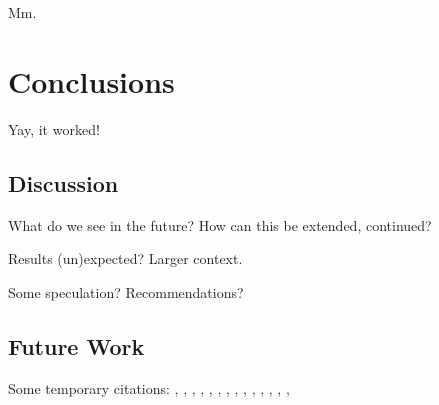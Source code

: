 \documentclass[a4paper,11pt]{kth-mag}
\begin{document}
Mm.





\pagestyle{newchap}
\chapter{Conclusions}
Yay, it worked!


\section{Discussion}

What do we see in the future? How can this be extended, continued?

Results (un)expected? Larger context.

Some speculation? Recommendations?

\section{Future Work}


Some temporary citations:
\cite{hoare69}, \cite{floyd67}, \cite{pnueli77}, \cite{leucker09abriefaccount},
\cite{bauer06monitoring}, \cite{bauer08goodbadugly}, \cite{delgado04taxonomy},
\cite{meyer92applyingdbc}, \cite{rosenblum95practicalassertions},
\cite{bartetzko01jass}, \cite{bodden04lightweightltl},
\cite{bodden05efficientrv}, \cite{becksmalltalktesting}, \cite{fowlerxunit},
\cite{matusiak09aoppy}












\end{document}
